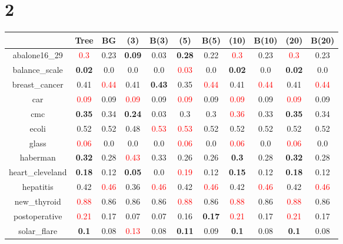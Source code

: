 \documentclass{article}%
\begin{document}
\section*{2}%
\begin{tabular}{c|cccccccccc}%
\hline%
&Tree&BG&(3)&B(3)&(5)&B(5)&(10)&B(10)&(20)&B(20)\\%
\hline%
abalone16\_29&\textcolor{red}{ 
0.3
}&0.23&\textbf{0.09}&0.03&\textbf{0.28}&0.22&\textcolor{red}{ 
0.3
}&0.23&\textcolor{red}{ 
0.3
}&0.23\\%
\hline%
balance\_scale&\textbf{0.02}&0.0&0.0&0.0&\textcolor{red}{ 
0.03
}&0.0&\textbf{0.02}&0.0&\textbf{0.02}&0.0\\%
\hline%
breast\_cancer&0.41&\textcolor{red}{ 
0.44
}&0.41&\textbf{0.43}&0.35&\textcolor{red}{ 
0.44
}&0.41&\textcolor{red}{ 
0.44
}&0.41&\textcolor{red}{ 
0.44
}\\%
\hline%
car&\textcolor{red}{ 
0.09
}&0.09&\textcolor{red}{ 
0.09
}&0.09&\textcolor{red}{ 
0.09
}&0.09&\textcolor{red}{ 
0.09
}&0.09&\textcolor{red}{ 
0.09
}&0.09\\%
\hline%
cmc&\textbf{0.35}&0.34&\textbf{0.24}&0.03&0.3&0.3&\textcolor{red}{ 
0.36
}&0.33&\textbf{0.35}&0.34\\%
\hline%
ecoli&0.52&0.52&0.48&\textcolor{red}{ 
0.53
}&\textcolor{red}{ 
0.53
}&0.52&0.52&0.52&0.52&0.52\\%
\hline%
glass&\textcolor{red}{ 
0.06
}&0.0&0.0&0.0&\textcolor{red}{ 
0.06
}&0.0&\textcolor{red}{ 
0.06
}&0.0&\textcolor{red}{ 
0.06
}&0.0\\%
\hline%
haberman&\textbf{0.32}&0.28&\textcolor{red}{ 
0.43
}&0.33&0.26&0.26&\textbf{0.3}&0.28&\textbf{0.32}&0.28\\%
\hline%
heart\_cleveland&\textbf{0.18}&0.12&\textbf{0.05}&0.0&\textcolor{red}{ 
0.19
}&0.12&\textbf{0.15}&0.12&\textbf{0.18}&0.12\\%
\hline%
hepatitis&0.42&\textcolor{red}{ 
0.46
}&0.36&\textcolor{red}{ 
0.46
}&0.42&\textcolor{red}{ 
0.46
}&0.42&\textcolor{red}{ 
0.46
}&0.42&\textcolor{red}{ 
0.46
}\\%
\hline%
new\_thyroid&\textcolor{red}{ 
0.88
}&0.86&0.86&0.86&\textcolor{red}{ 
0.88
}&0.86&\textcolor{red}{ 
0.88
}&0.86&\textcolor{red}{ 
0.88
}&0.86\\%
\hline%
postoperative&\textcolor{red}{ 
0.21
}&0.17&0.07&0.07&0.16&\textbf{0.17}&\textcolor{red}{ 
0.21
}&0.17&\textcolor{red}{ 
0.21
}&0.17\\%
\hline%
solar\_flare&\textbf{0.1}&0.08&\textcolor{red}{ 
0.13
}&0.08&\textbf{0.11}&0.09&\textbf{0.1}&0.08&\textbf{0.1}&0.08\\%

\end{tabular}
\end{document}

